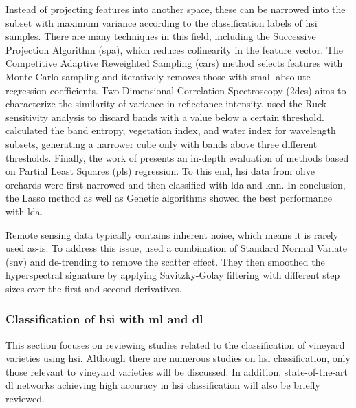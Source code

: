 Instead of projecting features into another space, these can be narrowed into the subset with maximum variance according to the classification labels of \acrshort{hsi} samples. There are many techniques in this field, including the Successive Projection Algorithm (\acrshort{spa}), which reduces colinearity in the feature vector. The Competitive Adaptive Reweighted Sampling (\acrshort{cars}) method selects features with Monte-Carlo sampling and iteratively removes those with small absolute regression coefficients. Two-Dimensional Correlation Spectroscopy (\acrshort{2dcs}) aims to characterize the similarity of variance in reflectance intensity. \cite{liu_dimension_2019} used the Ruck sensitivity analysis to discard bands with a value below a certain threshold. \cite{agilandeeswari_crop_2022} calculated the band entropy, vegetation index, and water index for wavelength subsets, generating a narrower cube only with bands above three different thresholds. Finally, the work of \cite{santos-rufo_wavelength_2020} presents an in-depth evaluation of methods based on Partial Least Squares (\acrshort{pls}) regression. To this end, \acrshort{hsi} data from olive orchards were first narrowed and then classified with \acrshort{lda} and \acrshort{knn}. In conclusion, the Lasso method \cite{friedman_regularization_2010} as well as Genetic algorithms \cite{mehmood_review_2012} showed the best performance with \acrshort{lda}. 

Remote sensing data typically contains inherent noise, which means it is rarely used as-is. To address this issue, \cite{gutierrez_--go_2018} used a combination of Standard Normal Variate (\acrshort{snv}) and de-trending to remove the scatter effect. They then smoothed the hyperspectral signature by applying Savitzky-Golay filtering with different step sizes over the first and second derivatives.

\subsubsection{Classification of \acrshort{hsi} with \acrshort{ml} and \acrshort{dl}}

This section focuses on reviewing studies related to the classification of vineyard varieties using \acrshort{hsi}. Although there are numerous studies on \acrshort{hsi} classification, only those relevant to vineyard varieties will be discussed. In addition, state-of-the-art \acrshort{dl} networks achieving high accuracy in \acrshort{hsi} classification will also be briefly reviewed.

